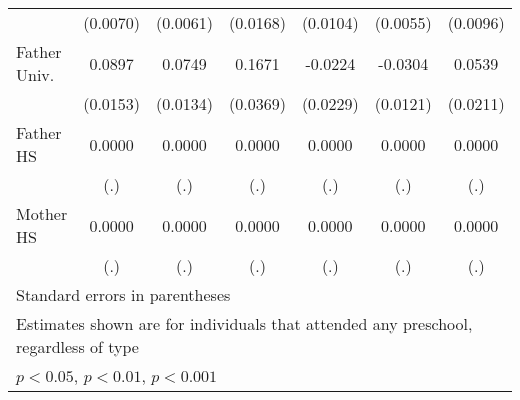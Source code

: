 \begin{table}[htbp]
\begin{tabular}{l*{6}{c}}
            &    (0.0070)         &    (0.0061)         &    (0.0168)         &    (0.0104)         &    (0.0055)         &    (0.0096)         \\
\addlinespace
Father Univ.&      0.0897\sym{***}&      0.0749\sym{***}&      0.1671\sym{***}&     -0.0224         &     -0.0304\sym{*}  &      0.0539\sym{*}  \\
            &    (0.0153)         &    (0.0134)         &    (0.0369)         &    (0.0229)         &    (0.0121)         &    (0.0211)         \\
\addlinespace
Father HS   &      0.0000         &      0.0000         &      0.0000         &      0.0000         &      0.0000         &      0.0000         \\
            &         (.)         &         (.)         &         (.)         &         (.)         &         (.)         &         (.)         \\
\addlinespace
Mother HS   &      0.0000         &      0.0000         &      0.0000         &      0.0000         &      0.0000         &      0.0000         \\
            &         (.)         &         (.)         &         (.)         &         (.)         &         (.)         &         (.)         \\
\bottomrule
\multicolumn{7}{l}{\footnotesize Standard errors in parentheses}\\
\multicolumn{7}{l}{\footnotesize Estimates shown are for individuals that attended any preschool, regardless of type}\\
\multicolumn{7}{l}{\footnotesize \sym{*} \(p<0.05\), \sym{**} \(p<0.01\), \sym{***} \(p<0.001\)}\\
\end{tabular}
\end{table}
